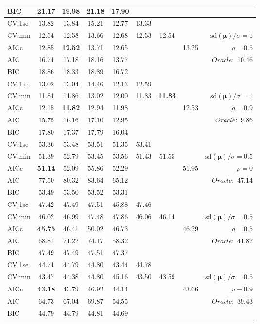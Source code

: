 \begin{table}
\begin{center}
\begin{tabular}{l*{7}{c}|r}
BIC & 21.17 & 19.98 & 21.18 & 17.90 & & & &  \\
 \hline 
CV.1se & 13.82 & 13.84 & 15.21 & 12.77 & 13.33 & & & \\
CV.min & 12.54 & 12.58 & 13.66 & 12.68 & 12.53 & 12.54 & & $\mathrm{sd}(\mathbf{\mu})/\sigma=1$ \\
AICc & 12.85 & {\bf 12.52} & 13.71 & 12.65 & & & 13.25 &  $\rho=0.5$ \\
AIC & 16.74 & 17.18 & 18.16 & 13.77 & & & &  \multirow{2}{*}{$Oracle: $ 10.46} \\
BIC & 18.86 & 18.33 & 18.89 & 16.72 & & & &  \\
 \hline 
CV.1se & 13.02 & 13.04 & 14.46 & 12.13 & 12.59 & & & \\
CV.min & 11.84 & 11.86 & 13.02 & 12.00 & 11.83 & {\bf 11.83} & & $\mathrm{sd}(\mathbf{\mu})/\sigma=1$ \\
AICc & 12.15 & {\bf 11.82} & 12.94 & 11.98 & & & 12.53 &  $\rho=0.9$ \\
AIC & 15.75 & 16.16 & 17.10 & 12.95 & & & &  \multirow{2}{*}{$Oracle: $ 9.86} \\
BIC & 17.80 & 17.37 & 17.79 & 16.04 & & & &  \\
 \hline 
CV.1se & 53.36 & 53.48 & 53.51 & 51.35 & 53.41 & & & \\
CV.min & 51.39 & 52.79 & 53.45 & 53.56 & 51.43 & 51.55 & & $\mathrm{sd}(\mathbf{\mu})/\sigma=0.5$ \\
AICc & {\bf 51.14} & 52.09 & 55.86 & 52.29 & & & 51.95 &  $\rho=0$ \\
AIC & 77.50 & 80.32 & 83.64 & 65.12 & & & &  \multirow{2}{*}{$Oracle: $ 47.14} \\
BIC & 53.49 & 53.50 & 53.52 & 53.31 & & & &  \\
 \hline 
CV.1se & 47.42 & 47.49 & 47.51 & 45.88 & 47.46 & & & \\
CV.min & 46.02 & 46.99 & 47.48 & 47.86 & 46.06 & 46.14 & & $\mathrm{sd}(\mathbf{\mu})/\sigma=0.5$ \\
AICc & {\bf 45.75} & 46.41 & 50.02 & 46.73 & & & 46.29 &  $\rho=0.5$ \\
AIC & 68.81 & 71.22 & 74.17 & 58.32 & & & &  \multirow{2}{*}{$Oracle: $ 41.82} \\
BIC & 47.49 & 47.49 & 47.51 & 47.37 & & & &  \\
 \hline 
CV.1se & 44.74 & 44.79 & 44.80 & 43.44 & 44.78 & & & \\
CV.min & 43.47 & 44.38 & 44.80 & 45.16 & 43.50 & 43.59 & & $\mathrm{sd}(\mathbf{\mu})/\sigma=0.5$ \\
AICc & {\bf 43.18} & 43.79 & 46.92 & 44.14 & & & 43.66 &  $\rho=0.9$ \\
AIC & 64.73 & 67.04 & 69.87 & 54.55 & & & &  \multirow{2}{*}{$Oracle: $ 39.43} \\
BIC & 44.79 & 44.79 & 44.81 & 44.69 & & & &  \\
 \hline 
\end{tabular}
\end{center}
\vspace{-1cm}
\end{table}





